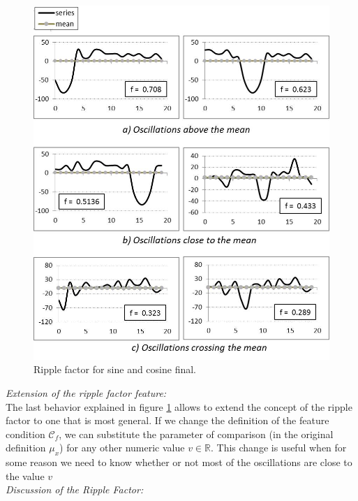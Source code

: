 \begin{figure}[h!]
  \vspace{0.5em} %
  \includegraphics[scale=0.7]{Figures/Example_3_rf.jpg}
  \caption{Ripple factor for sine and cosine final.}
  \label{fig:rf_ex3}
\end{figure}


\textit{Extension of the ripple factor feature:} \\

The last behavior explained in figure \ref{fig:rf_ex3} allows to extend the concept of the ripple factor to one that is most general. If we change the definition of the feature condition $\mathscr{C}_f$, we can substitute the parameter of comparison (in the original definition $\mu_x$) for any other numeric value $v \in \mathbb{R}$. This change is useful when for some reason we need to know whether or not most of the
oscillations are close to the value $v$ \\


\textit{Discussion of the Ripple Factor:} \\
 
